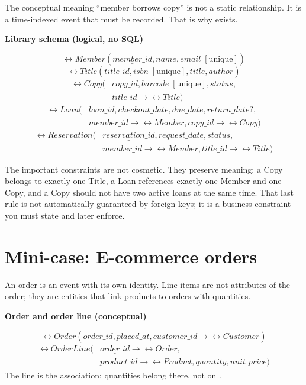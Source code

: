 The conceptual meaning “member borrows copy” is not a static relationship.
It is a time-indexed event that must be recorded.
That is why  exists.

\begin{examplebox}
\textbf{Library schema (logical, no SQL)}\par\smallskip
\[
\rel{Member}(\underline{member\_id}, name, email \;[\text{unique}])
\]
\[
\rel{Title}(\underline{title\_id}, isbn \;[\text{unique}], title, author)
\]
\[
\begin{aligned}
\rel{Copy}(&\underline{copy\_id}, barcode \;[\text{unique}], status, \\
&title\_id \rightarrow \rel{Title})
\end{aligned}
\]
\[
\begin{aligned}
\rel{Loan}(&\underline{loan\_id}, checkout\_date, due\_date, return\_date?, \\
&member\_id \rightarrow \rel{Member}, copy\_id \rightarrow \rel{Copy})
\end{aligned}
\]
\[
\begin{aligned}
\rel{Reservation}(&\underline{reservation\_id}, request\_date, status, \\
&member\_id \rightarrow \rel{Member}, title\_id \rightarrow \rel{Title})
\end{aligned}
\]
\end{examplebox}

The important constraints are not cosmetic.
They preserve meaning:
a Copy belongs to exactly one Title,
a Loan references exactly one Member and one Copy,
and a Copy should not have two active loans at the same time.
That last rule is not automatically guaranteed by foreign keys; it is a business constraint you must state and later enforce.

\section{Mini-case: E-commerce orders}
An order is an event with its own identity.
Line items are not attributes of the order; they are entities that link products to orders with quantities.

\begin{examplebox}
\textbf{Order and order line (conceptual)}\par\smallskip
\[
\rel{Order}(\underline{order\_id}, placed\_at, customer\_id \rightarrow \rel{Customer})
\]
\[
\begin{aligned}
\rel{OrderLine}(&\underline{order\_id} \rightarrow \rel{Order}, \\
&\underline{product\_id} \rightarrow \rel{Product}, quantity, unit\_price)
\end{aligned}
\]
The line is the association; quantities belong there, not on .
\end{examplebox}

